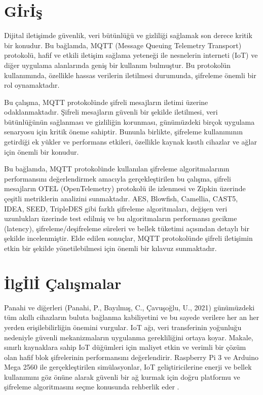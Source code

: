 \documentclass[conference, a4paper]{IEEEtran}
\begin{document}
	\IEEEpeerreviewmaketitle
	
	\IEEEpubidadjcol
	
	
	\section{G{\footnotesize İ}r{\footnotesize İ}ş}
	
	Dijital iletişimde güvenlik, veri bütünlüğü ve gizliliği sağlamak son derece kritik bir konudur. Bu bağlamda, MQTT (Message Queuing Telemetry Transport) protokolü, hafif ve etkili iletişim sağlama yeteneği ile nesnelerin interneti (IoT) ve diğer uygulama alanlarında geniş bir kullanım bulmuştur. Bu protokolün kullanımında, özellikle hassas verilerin iletilmesi durumunda, şifreleme önemli bir rol oynamaktadır.

    Bu çalışma, MQTT protokolünde şifreli mesajların iletimi üzerine odaklanmaktadır. Şifreli mesajların güvenli bir şekilde iletilmesi, veri bütünlüğünün sağlanması ve gizliliğin korunması, günümüzdeki birçok uygulama senaryosu için kritik öneme sahiptir. Bununla birlikte, şifreleme kullanımının getirdiği ek yükler ve performans etkileri, özellikle kaynak kısıtlı cihazlar ve ağlar için önemli bir konudur.

    Bu bağlamda, MQTT protokolünde kullanılan şifreleme algoritmalarının performansını değerlendirmek amacıyla gerçekleştirilen bu çalışma, şifreli mesajların OTEL (OpenTelemetry) protokolü ile izlenmesi ve Zipkin üzerinde çeşitli metriklerin analizini sunmaktadır. AES, Blowfish, Camellia, CAST5, IDEA, SEED, TripleDES gibi farklı şifreleme algoritmaları, değişen veri uzunlukları üzerinde test edilmiş ve bu algoritmaların performansı gecikme (latency), şifreleme/deşifreleme süreleri ve bellek tüketimi açısından detaylı bir şekilde incelenmiştir. Elde edilen sonuçlar, MQTT protokolünde şifreli iletişimin etkin bir şekilde yönetilebilmesi için önemli bir kılavuz sunmaktadır.
 
	\section{{\footnotesize İ}lg{\footnotesize İ}l{\footnotesize İ} {\footnotesize Ç}alışmalar}

    Panahi ve diğerleri (Panahi, P., Bayılmış, C., Çavuşoğlu, U., 2021) günümüzdeki tüm akıllı cihazların buluta bağlanma kabiliyetini ve bu sayede verilere her an her yerden erişilebilirliğin önemini vurgular. IoT ağı, veri transferinin yoğunluğu nedeniyle güvenli mekanizmaların uygulanma gerekliliğini ortaya koyar. Makale, sınırlı kaynaklara sahip IoT düğümleri için maliyet etkin ve verimli bir çözüm olan hafif blok şifrelerinin performansını değerlendirir. Raspberry Pi 3 ve Arduino Mega 2560 ile gerçekleştirilen simülasyonlar, IoT geliştiricilerine enerji ve bellek kullanımını göz önüne alarak güvenli bir ağ kurmak için doğru platformu ve şifreleme algoritmasını seçme konusunda rehberlik eder \cite{paper1}.
\end{document}
